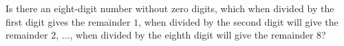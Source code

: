 Is there an eight-digit number without zero digits, which when divided by the first digit gives the remainder $1$, when divided by the second digit will give the remainder $2$, ..., when divided by the eighth digit will give the remainder $8$?